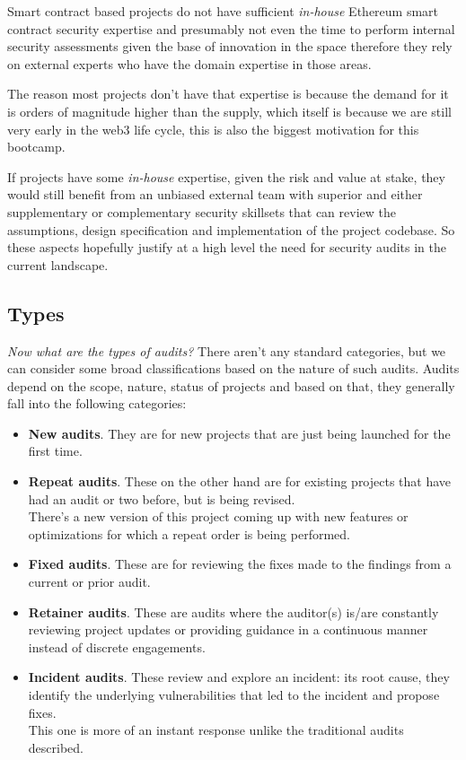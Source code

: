 Smart contract based projects do not have sufficient \emph{in-house}
Ethereum smart contract security expertise and presumably not even the
time to perform internal security assessments given the base of
innovation in the space therefore they rely on external experts who have
the domain expertise in those areas.

The reason most projects don't have that expertise is because the demand
for it is orders of magnitude higher than the supply, which itself is
because we are still very early in the web3 life cycle, this is also the
biggest motivation for this bootcamp.

If projects have some \emph{in-house} expertise, given the risk and
value at stake, they would still benefit from an unbiased external team
with superior and either supplementary or complementary security
skillsets that can review the assumptions, design specification and
implementation of the project codebase. So these aspects hopefully
justify at a high level the need for security audits in the current
landscape.

\subsection{Types}\label{types}

\emph{Now what are the types of audits?} There aren't any standard
categories, but we can consider some broad classifications based on the
nature of such audits. Audits depend on the scope, nature, status of
projects and based on that, they generally fall into the following
categories:

\begin{itemize}
\item
  \textbf{New audits}. They are for new projects that are just being
  launched for the first time.
\item
  \textbf{Repeat audits}. These on the other hand are for existing
  projects that have had an audit or two before, but is being revised.\\

  There's a new version of this project coming up with new features or
  optimizations for which a repeat order is being performed.
\item
  \textbf{Fixed audits}. These are for reviewing the fixes made to the
  findings from a current or prior audit.
\item
  \textbf{Retainer audits}. These are audits where the auditor(s) is/are
  constantly reviewing project updates or providing guidance in a
  continuous manner instead of discrete engagements.
\item
  \textbf{Incident audits}. These review and explore an incident: its
  root cause, they identify the underlying vulnerabilities that led to
  the incident and propose fixes.\\

  This one is more of an instant response unlike the traditional audits
  described.
\end{itemize}

